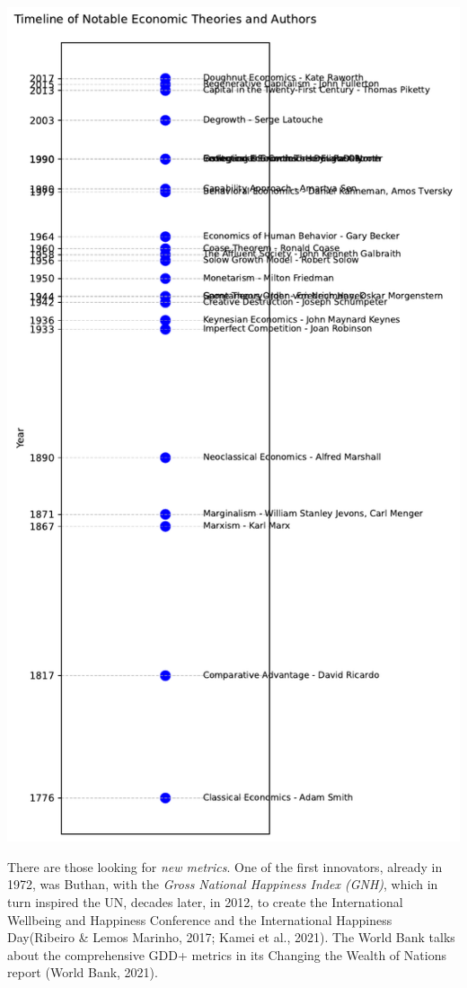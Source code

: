 \documentclass[
  letterpaper,
  DIV=11,
  numbers=noendperiod]{scrartcl}
\begin{document}
\includegraphics{_thesis_files/figure-pdf/cell-46-output-1.pdf}

There are those looking for \emph{new metrics}. One of the first
innovators, already in 1972, was Buthan, with the \emph{Gross National
Happiness Index (GNH)}, which in turn inspired the UN, decades later, in
2012, to create the International Wellbeing and Happiness Conference and
the International Happiness Day(Ribeiro \& Lemos Marinho, 2017; Kamei et
al., 2021). The World Bank talks about the comprehensive GDD+ metrics in
its Changing the Wealth of Nations report (World Bank, 2021).
\end{document}
